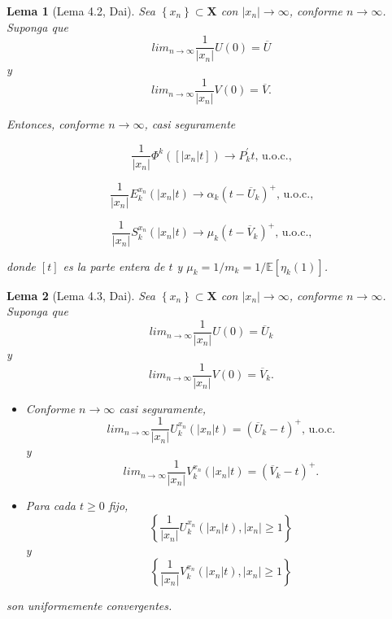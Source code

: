 \documentclass{article}
\newtheorem{Lema}{Lema}[section]
\newcommand{\esp}{\mathbb{E}}
\numberwithin{equation}{section}
\begin{document}
\begin{Lema}[Lema 4.2, Dai\cite{Dai}]\label{Lema4.2}
Sea $\left\{x_{n}\right\}\subset \mathbf{X}$ con
$|x_{n}|\rightarrow\infty$, conforme $n\rightarrow\infty$. Suponga
que
\[lim_{n\rightarrow\infty}\frac{1}{|x_{n}|}U\left(0\right)=\overline{U}\]
y
\[lim_{n\rightarrow\infty}\frac{1}{|x_{n}|}V\left(0\right)=\overline{V}.\]

Entonces, conforme $n\rightarrow\infty$, casi seguramente

\begin{equation}\label{E1.4.2}
\frac{1}{|x_{n}|}\Phi^{k}\left(\left[|x_{n}|t\right]\right)\rightarrow
P_{k}^{'}t\textrm{, u.o.c.,}
\end{equation}

\begin{equation}\label{E1.4.3}
\frac{1}{|x_{n}|}E^{x_{n}}_{k}\left(|x_{n}|t\right)\rightarrow
\alpha_{k}\left(t-\overline{U}_{k}\right)^{+}\textrm{, u.o.c.,}
\end{equation}

\begin{equation}\label{E1.4.4}
\frac{1}{|x_{n}|}S^{x_{n}}_{k}\left(|x_{n}|t\right)\rightarrow
\mu_{k}\left(t-\overline{V}_{k}\right)^{+}\textrm{, u.o.c.,}
\end{equation}

donde $\left[t\right]$ es la parte entera de $t$ y
$\mu_{k}=1/m_{k}=1/\esp\left[\eta_{k}\left(1\right)\right]$.
\end{Lema}

\begin{Lema}[Lema 4.3, Dai\cite{Dai}]\label{Lema.4.3}
Sea $\left\{x_{n}\right\}\subset \mathbf{X}$ con
$|x_{n}|\rightarrow\infty$, conforme $n\rightarrow\infty$. Suponga
que
\[lim_{n\rightarrow\infty}\frac{1}{|x_{n}|}U\left(0\right)=\overline{U}_{k}\]
y
\[lim_{n\rightarrow\infty}\frac{1}{|x_{n}|}V\left(0\right)=\overline{V}_{k}.\]
\begin{itemize}
\item[a)] Conforme $n\rightarrow\infty$ casi seguramente,
\[lim_{n\rightarrow\infty}\frac{1}{|x_{n}|}U^{x_{n}}_{k}\left(|x_{n}|t\right)=\left(\overline{U}_{k}-t\right)^{+}\textrm{, u.o.c.}\]
y
\[lim_{n\rightarrow\infty}\frac{1}{|x_{n}|}V^{x_{n}}_{k}\left(|x_{n}|t\right)=\left(\overline{V}_{k}-t\right)^{+}.\]

\item[b)] Para cada $t\geq0$ fijo,
\[\left\{\frac{1}{|x_{n}|}U^{x_{n}}_{k}\left(|x_{n}|t\right),|x_{n}|\geq1\right\}\]
y
\[\left\{\frac{1}{|x_{n}|}V^{x_{n}}_{k}\left(|x_{n}|t\right),|x_{n}|\geq1\right\}\]
\end{itemize}
son uniformemente convergentes.
\end{Lema}
\end{document}
